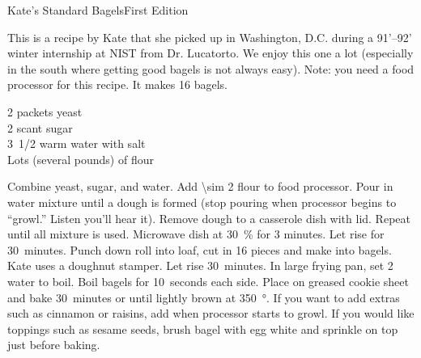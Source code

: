 \begin{entry}{Kate's Standard Bagels}{First Edition}

\begin{open}
  This is a recipe by Kate that she picked up in Washington, D.C. during
  a 91'--92' winter internship at NIST from Dr. Lucatorto.  We enjoy this one
  a lot (especially in the south where getting good bagels is not always
  easy). Note: you need a food processor for this recipe. It makes 16 bagels.
\end{open}
\begin{ingredients}
  2 packets yeast \\
  2 scant \si{\tblspoon} sugar\\
  \SI{1/2}[3]{\cup} warm water with salt \\
  Lots (several pounds) of flour
\end{ingredients}
Combine yeast, sugar, and water.  Add \SI{\sim 2}{\cup} flour to food
processor. Pour in water mixture until a dough is formed (stop pouring when
processor begins to ``growl.'' Listen you'll hear it).  Remove dough to a
casserole dish with lid. Repeat until all mixture is used.  Microwave dish at
\SI{30}{\percent} for 3 minutes.  Let rise for 30~minutes.  Punch down roll
into loaf, cut in 16 pieces and make into bagels. Kate uses a doughnut
stamper. Let rise 30~minutes. In large frying pan, set \SI{2}{\inch} water to
boil.  Boil bagels for 10~seconds each side.  Place on greased cookie sheet
and bake 30~minutes or until lightly brown at \SI{350}{\degree}. If you want
to add extras such as cinnamon or raisins, add when processor starts to
growl. If you would like toppings such as sesame seeds, brush bagel with egg
white and sprinkle on top just before baking.
\end{entry}

